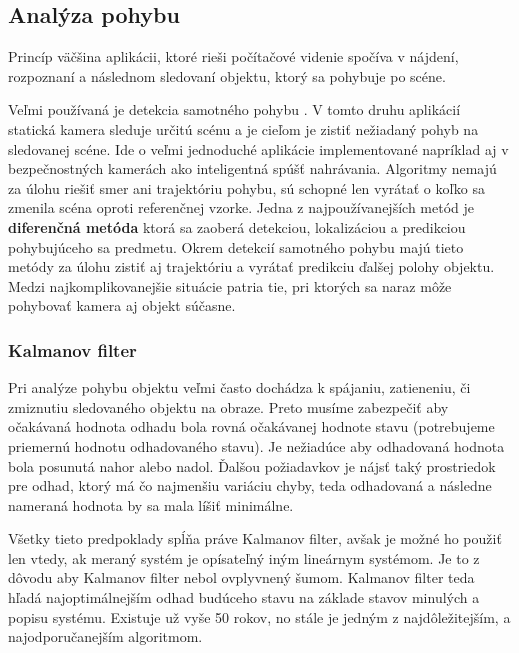 \subsection{Analýza pohybu }
Princíp väčšina aplikácii, ktoré rieši počítačové videnie spočíva v nájdení, rozpoznaní a následnom sledovaní objektu, ktorý sa pohybuje po scéne. 

Veľmi používaná je detekcia samotného pohybu \cite{pocitacove_videnie_v_praxi}. V tomto druhu aplikácií statická kamera sleduje určitú scénu a je cieľom je zistiť nežiadaný pohyb na sledovanej scéne. Ide o veľmi jednoduché aplikácie implementované napríklad aj v bezpečnostných kamerách ako inteligentná spúšť nahrávania. Algoritmy nemajú za úlohu riešiť smer ani trajektóriu pohybu, sú schopné len vyrátať o koľko sa zmenila scéna oproti referenčnej vzorke. Jedna z najpoužívanejších metód je \textbf{diferenčná metóda} ktorá sa zaoberá detekciou, lokalizáciou a predikciou pohybujúceho sa predmetu. Okrem detekcií samotného pohybu majú tieto metódy za úlohu zistiť aj trajektóriu a vyrátať predikciu ďalšej polohy objektu. Medzi najkomplikovanejšie situácie patria tie, pri ktorých sa naraz môže pohybovať kamera aj objekt súčasne. \cite{pocitacove_videnie_v_praxi}

\subsubsection{Kalmanov filter}
\label{sec:kalman}
Pri analýze pohybu objektu veľmi často dochádza k spájaniu, zatieneniu, či zmiznutiu sledovaného objektu na obraze. Preto musíme zabezpečiť aby očakávaná hodnota odhadu bola rovná očakávanej hodnote stavu (potrebujeme priemernú hodnotu odhadovaného stavu). Je nežiadúce aby odhadovaná hodnota bola posunutá nahor alebo nadol. Ďalšou požiadavkov je nájsť taký prostriedok pre odhad, ktorý má čo najmenšiu variáciu chyby, teda odhadovaná a následne nameraná hodnota by sa mala líšiť minimálne. \cite{Kalman_web} 

Všetky tieto predpoklady spĺňa práve Kalmanov filter, avšak je možné ho použiť len vtedy, ak  meraný systém je opísateľný iným lineárnym systémom. Je to z dôvodu aby Kalmanov filter nebol ovplyvnený šumom. Kalmanov filter teda hľadá najoptimálnejším odhad budúceho stavu na základe stavov minulých a popisu systému. Existuje už vyše 50 rokov, no stále je jedným z najdôležitejším, a najodporučanejším algoritmom. \cite{Kalman_web}

